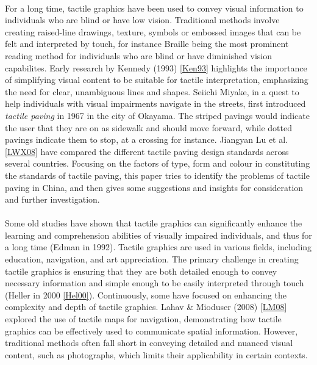 \documentclass[12pt, letterpaper]{article}
\begin{document}
\begin{spacing}{1.15}
\paragraph{}
For a long time, tactile graphics have been used to convey visual information to individuals who are blind or have low vision. Traditional methods involve
creating raised-line drawings, texture, symbols or embossed images that can be felt and interpreted by touch, for instance Braille being the most prominent reading method for
individuals who are blind or have diminished vision capabilites. Early research by Kennedy (1993) \hyperlink{Ken93target}{[Ken93]} highlights the
importance of simplifying visual content to be suitable for tactile interpretation, emphasizing the need for clear, unambiguous lines and shapes. Seiichi Miyake, in a quest
to help individuals with visual impairments navigate in the streets, first introduced \emph{tactile paving} in 1967 in the city of Okayama. The striped pavings would indicate
the user that they are on as sidewalk and should move forward, while dotted pavings indicate them to stop, at a crossing for instance. Jiangyan Lu et al. \hyperlink{LWXtarget}{[LWX08]}
have compared the different tactile paving design standards across several countries. Focusing on the factors of type, form and colour in constituting the standards of tactile paving,
this paper tries to identify the problems of tactile paving in China, and then gives some suggestions and insights for consideration and further investigation.


\paragraph{}
Some old studies have shown that tactile graphics can significantly enhance the learning and comprehension abilities of visually impaired individuals, and thus for
a long time (Edman in 1992). Tactile graphics are used in various fields, including education, navigation, and art appreciation. The primary challenge in creating tactile graphics
is ensuring that they are both detailed enough to convey necessary information and simple enough to be easily interpreted through touch (Heller in 2000 \hyperlink{Hel00target}{[Hel00]}).
Continuously, some have focused on enhancing the complexity and depth of tactile graphics. Lahav \& Mioduser (2008) \hyperlink{LM08target}{[LM08]} explored the use of tactile
maps for navigation, demonstrating how tactile graphics can be effectively used to communicate spatial information. However, traditional methods often fall short in conveying
detailed and nuanced visual content, such as photographs, which limits their applicability in certain contexts.



\end{spacing}
\end{document}
